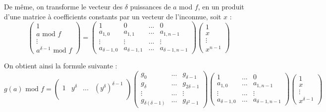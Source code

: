 \documentclass[a4paper]{article}
\begin{document}
De même, on transforme le vecteur des $\delta$ puissances de $a$ mod $f$, en un produit d'une matrice à coefficients constants par un vecteur de l'inconnue, soit $x$ :
\[
    \begin{pmatrix}
        1 \\
        a \text{ mod }f\\
        \vdots \\
        a^{\delta-1} \text{ mod }f
    \end{pmatrix}
    =
    \begin{pmatrix}
        1 & 0 & ... & 0 \\
        a_{1,0} & a_{1,1} & ... & a_{1,n-1} \\
        \vdots & \vdots & ... & \vdots \\
        a_{\delta-1,0} & a_{\delta-1,1} & ... & a_{\delta-1,n-1}
    \end{pmatrix}
    \begin{pmatrix}
        1 \\
        x \\
        \vdots \\
        x^{n-1}
    \end{pmatrix}
\]

On obtient ainsi la formule suivante :
\[
g(a)\text{ mod }f =
\begin{pmatrix}
    1 & y^\delta & ... & (y^\delta)^{\delta-1}  \\  
\end{pmatrix}
\begin{pmatrix}
    g_0 & ... & g_{\delta-1} \\
    g_{\delta} & ... & g_{2\delta-1} \\
    \vdots & ... & \vdots \\
    g_{\delta(\delta-1)} & ... & g_{\delta^2-1}
\end{pmatrix}
\begin{pmatrix}
    1 &  ... & 0 \\
    a_{1,0} & ... & a_{1,n-1} \\
    \vdots &  ... & \vdots \\
    a_{\delta-1,0} & ... & a_{\delta-1,n-1}
\end{pmatrix}
\begin{pmatrix}
    1 \\
    x \\
    \vdots \\
    x^{\delta-1}
\end{pmatrix}
\]
\end{document}
